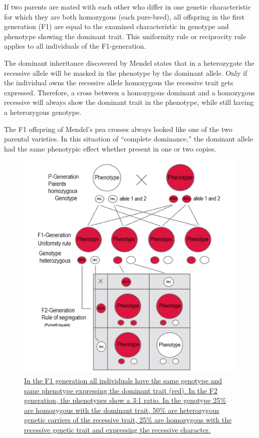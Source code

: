 If two parents are mated with each other who differ in one genetic characteristic for which they are both homozygous (each pure-bred), all offspring in the first generation (F1) are equal to the examined characteristic in genotype and phenotype showing the dominant trait. This uniformity rule or reciprocity rule applies to all individuals of the F1-generation.

The dominant inheritance discovered by Mendel states that in a heterozygote the recessive allele will be masked in the phenotype by the dominant allele. Only if the individual owns the recessive allele homozygous the recessive trait gets expressed. Therefore, a cross between a homozygous dominant and a homozygous recessive will always show the dominant trait in the phenotype, while still having a heterozygous genotype.

The F1 offspring of Mendel's pea crosses always looked like one of the two parental varieties. In this situation of ``complete dominance,'' the dominant allele had the same phenotypic effect whether present in one or two copies.



\begin{figure}

{\centering \includegraphics[width=0.7\linewidth]{./figures/mendel/Dominant-recessive_inheritance_P_-_F1_-_F2} 

}

\caption{\href{https://commons.wikimedia.org/wiki/File:Dominant-recessive_inheritance_P_-_F1_-_F2.png}{In the F1 generation all individuals have the same genotype and same phenotype expressing the dominant trait (red). In the F2 generation, the phenotypes show a 3:1 ratio. In the genotype 25\% are homozygous with the dominant trait, 50\% are heterozygous genetic carriers of the recessive trait, 25\% are homozygous with the recessive genetic trait and expressing the recessive character.}}\label{fig:dominantinheritance}
\end{figure}

